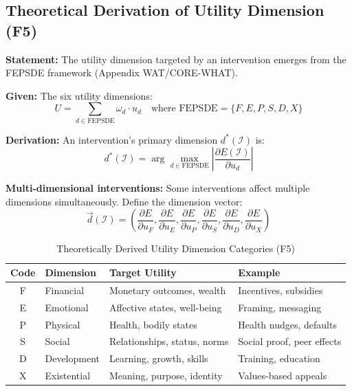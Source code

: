 \subsection{Theoretical Derivation of Utility Dimension (F5)}
\label{sec:hhh-dimension}

\begin{tcolorbox}[colback=blue!5!white, colframe=blue!75!black,
    title=\textbf{Theorem HHH-T4: Utility Dimension Emergence from WHAT}]

\textbf{Statement:} The utility dimension targeted by an intervention emerges from the FEPSDE framework (Appendix WAT/CORE-WHAT).

\textbf{Given:} The six utility dimensions:
\begin{equation}
U = \sum_{d \in \text{FEPSDE}} \omega_d \cdot u_d \quad \text{where FEPSDE} = \{F, E, P, S, D, X\}
\end{equation}

\textbf{Derivation:} An intervention's primary dimension $d^*(\mathcal{I})$ is:
\begin{equation}
d^*(\mathcal{I}) = \arg\max_{d \in \text{FEPSDE}} \left| \frac{\partial E(\mathcal{I})}{\partial u_d} \right|
\label{eq:hhh-dimension-mapping}
\end{equation}

\textbf{Multi-dimensional interventions:} Some interventions affect multiple dimensions simultaneously. Define the dimension vector:
\begin{equation}
\vec{d}(\mathcal{I}) = \left( \frac{\partial E}{\partial u_F}, \frac{\partial E}{\partial u_E}, \frac{\partial E}{\partial u_P}, \frac{\partial E}{\partial u_S}, \frac{\partial E}{\partial u_D}, \frac{\partial E}{\partial u_X} \right)
\end{equation}

\end{tcolorbox}

\begin{table}[htbp]
\centering
\caption{Theoretically Derived Utility Dimension Categories (F5)}
\label{tab:hhh-dimension-derived}
\renewcommand{\arraystretch}{1.3}
\begin{tabular}{@{}clp{5cm}p{3.5cm}@{}}
\toprule
\textbf{Code} & \textbf{Dimension} & \textbf{Target Utility} & \textbf{Example} \\
\midrule
F & Financial & Monetary outcomes, wealth & Incentives, subsidies \\
E & Emotional & Affective states, well-being & Framing, messaging \\
P & Physical & Health, bodily states & Health nudges, defaults \\
S & Social & Relationships, status, norms & Social proof, peer effects \\
D & Development & Learning, growth, skills & Training, education \\
X & Existential & Meaning, purpose, identity & Values-based appeals \\
\bottomrule
\end{tabular}
\end{table}


